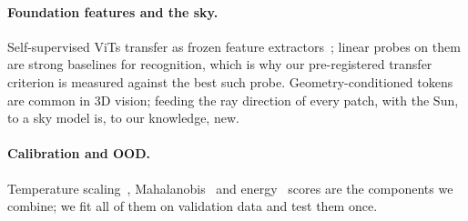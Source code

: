 \paragraph{Foundation features and the sky.} Self-supervised ViTs transfer as frozen feature
extractors~\cite{simeoni2025dinov3,oquab2024dinov2}; linear probes on them are strong baselines for recognition,
which is why our pre-registered transfer criterion is measured against the best such probe. Geometry-conditioned
tokens are common in 3D vision; feeding the ray direction of every patch, with the Sun, to a sky model is, to our
knowledge, new.

\paragraph{Calibration and OOD.} Temperature scaling~\cite{guo2017calibration}, Mahalanobis~\cite{lee2018mahalanobis}
and energy~\cite{liu2020energy} scores are the components we combine; we fit all of them on validation data and
test them once.
